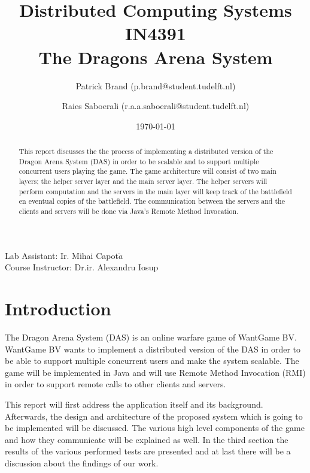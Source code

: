 \documentclass{article}
\title{Distributed Computing Systems IN4391\\ The Dragons Arena System %
}
\author{Patrick Brand (p.brand@student.tudelft.nl) \and
    Raies Saboerali (r.a.a.saboerali@student.tudelft.nl)
}
\date{\today}
\begin{document}
\maketitle
\thispagestyle{empty}
\begin{center}
Lab Assistant: Ir. Mihai Capot$\breve{a}$ \\
Course Instructor: Dr.ir. Alexandru Iosup
\end{center}

\begin{abstract}
This report discusses the the process of implementing a distributed version of the Dragon Arena System (DAS) in order to be scalable and to support multiple concurrent users playing the game.
The game architecture will consist of two main layers; the helper server layer and the main server layer.
The helper servers will perform computation and the servers in the main layer will keep track of the battlefield en eventual copies of the battlefield.
The communication between the servers and the clients and servers will be done via Java's Remote Method Invocation.
\end{abstract}


\section{Introduction}

The Dragon Arena System (DAS) is an online warfare game of WantGame BV.
WantGame BV wants to implement a distributed version of the DAS in order to be able to support multiple concurrent users and make the system scalable.
The game will be implemented in Java and will use Remote Method Invocation (RMI) in order to support remote calls to other clients and servers.

This report will first address the application itself and its background.
Afterwards, the design and architecture of the proposed system which is going to be implemented will be discussed. 
The various high level components of the game and how they communicate will be explained as well.
In the third section the results of the various performed tests are presented and at last there will be a discussion about the findings of our work.

\newpage









  



\nocite{*}


\end{document}
